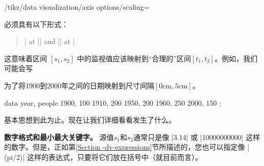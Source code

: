 \begin{key}{/tikz/data visualization/axis options/scaling=} %

     必须具有以下形式：
    \begin{quote}
        | at || and || at |
    \end{quote}
    这意味着区间 $[s_1,s_2]$ 中的监视值应该映射到``合理的''区间$[t_1,t_2]$。例如，我们可能会写
\begin{codeexample}
\end{codeexample}
    为了将1900到2000年之间的日期映射到尺寸间隔$[0\mathrm{cm},5\mathrm{cm}]$。
\begin{codeexample}[preamble={\usetikzlibrary{datavisualization}}]
\tikz \datavisualization
   [scientific axes,
    x axis={attribute=people, length=2.5cm, ticks=few},
    y axis={attribute=year, scaling=1900 at 0cm and 2000 at 5cm},
    visualize as scatter]
  data {
    year, people
    1900, 100
    1910, 200
    1950, 200
    1960, 250
    2000, 150
  };
\end{codeexample}
    基本思想到此为止。现在让我们详细看看发生了什么。


    \medskip

    \textbf{数字格式和最小最大关键字。} 源值$s_1$和$s_2$通常只是像 |3.14| 或 |10000000000| 这样的数字。但是，正如第\ref{Section -dv-expressions}节所描述的，您也可以指定像 |(pi/2)| 这样的表达式，只要将它们放在括号中（就目前而言）。



\end{key}

